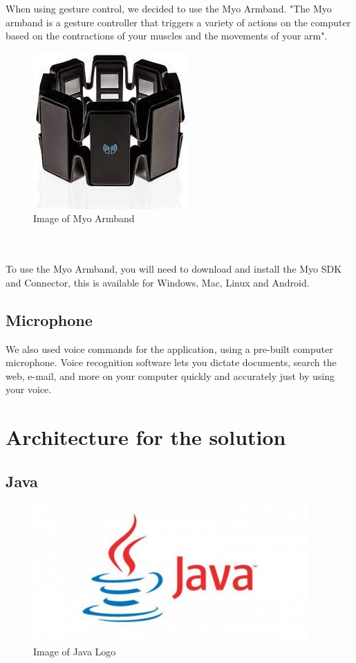 \documentclass{article}
\begin{document}
When using gesture control, we decided to use the Myo Armband. "The Myo armband is a gesture controller that triggers a variety of actions on the computer based on the contractions of your muscles and the movements of your arm".
\begin{figure}[h]
    \includegraphics[scale=0.6]{img/myoarmband2.jpg}
    \centering
    \caption{Image of Myo Armband}
    \label{fig: A Picture of the Myo Armband}
\end{figure}
\\ \\
To use the Myo Armband, you will need to download and install the Myo SDK and Connector, this is available for Windows, Mac, Linux and Android.

\subsection{Microphone}

We also used voice commands for the application, using a pre-built computer microphone. Voice recognition software lets you dictate documents, search the web, e-mail, and more on your computer quickly and accurately just by using your voice.

\section{Architecture for the solution}

\subsection{Java}

\begin{figure}[h]
    \includegraphics[scale=0.6]{img/javalogo.jpg}
    \centering
    \caption{Image of Java Logo}
    \label{fig: A Picture of the Java Logo}
\end{figure}
\end{document}
